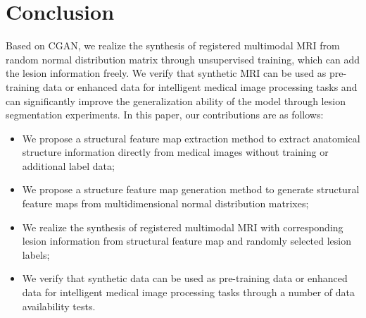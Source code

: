 \documentclass[letterpaper]{article} %
\begin{document}
%

\section{Conclusion}
Based on CGAN, we realize the synthesis of registered multimodal MRI from random normal distribution matrix through unsupervised training, which can add the lesion information freely. 
We verify that synthetic MRI can be used as pre-training data or enhanced data for intelligent medical image processing tasks and can significantly improve the generalization ability of the model through lesion segmentation experiments.
In this paper, our contributions are as follows:
\begin{itemize}
	\item We propose a structural feature map extraction method to extract anatomical structure information directly from medical images without training or additional label data;
	\item We propose a structure feature map generation method to generate structural feature maps from multidimensional normal distribution matrixes;
	\item We realize the synthesis of registered multimodal MRI with corresponding lesion information from structural feature map and randomly selected lesion labels;
	\item We verify that synthetic data can be used as pre-training data or enhanced data for intelligent medical image processing tasks through a number of data availability tests.
	
\end{itemize}



\fontsize{9.0pt}{10.0pt}



\end{document}
